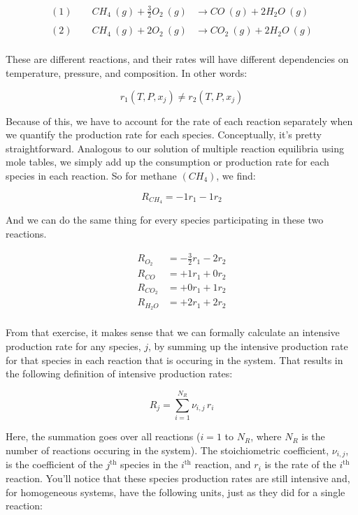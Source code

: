 \documentclass[11pt]{article}
\begin{document}
\begin{align*}
    (1) \qquad CH_4 \ (g) + \frac{3}{2} O_2 \ (g) &\longrightarrow CO \ (g) + 2H_2O \ (g) \\
    \\
    (2) \qquad CH_4 \ (g) + 2 O_2 \ (g) &\longrightarrow CO_2 \ (g) + 2H_2O \ (g) \\
\end{align*}

These are different reactions, and their rates will have different
dependencies on temperature, pressure, and composition. In other words:

\[r_1(T,P,x_j) \neq r_2(T,P,x_j)\]

Because of this, we have to account for the rate of each reaction
separately when we quantify the production rate for each species.
Conceptually, it's pretty straightforward. Analogous to our solution of
multiple reaction equilibria using mole tables, we simply add up the
consumption or production rate for each species in each reaction. So for
methane \((CH_4)\), we find:

\[R_{CH_4} = -1r_1 - 1r_2\]

And we can do the same thing for every species participating in these
two reactions.

\begin{align}
    R_{O_2} &= -\frac{3}{2}r_1 - 2r_2\\
    R_{CO} &= +1r_1 + 0r_2\\
    R_{CO_2} &= +0r_1 + 1r_2\\
    R_{H_2O} &= +2r_1 + 2r_2\\
\end{align}

From that exercise, it makes sense that we can formally calculate an
intensive production rate for any species, \(j\), by summing up the
intensive production rate for that species in each reaction that is
occuring in the system. That results in the following definition of
intensive production rates:

\[R_j = \sum_{i = 1}^{N_R} \nu_{i,j} \, r_i\]

Here, the summation goes over all reactions (\(i = 1\) to \(N_R\), where
\(N_R\) is the number of reactions occuring in the system). The
stoichiometric coefficient, \(\nu_{i,j}\), is the coefficient of the
\(j^{\text{th}}\) species in the \(i^{\text{th}}\) reaction, and \(r_i\)
is the rate of the \(i^{\text{th}}\) reaction. You'll notice that these
species production rates are still intensive and, for homogeneous
systems, have the following units, just as they did for a single
reaction:
\end{document}
